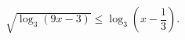\begin{ex}[type=inequality]
	\begin{condition}
		$ \sqrt{\log_3(9x - 3)}\leqslant\log_3\left(x - \dfrac{1}{3}\right).$
	\end{condition}
\end{ex}